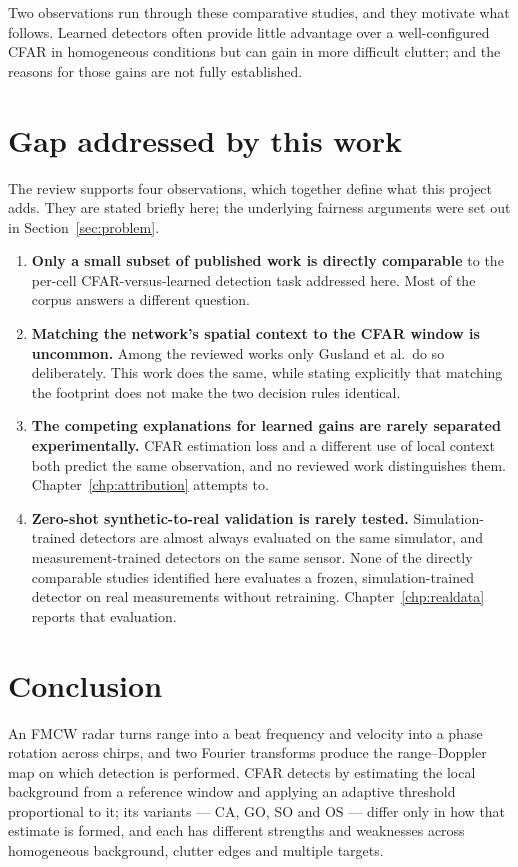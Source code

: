 Two observations run through these comparative studies, and they motivate what follows. Learned
detectors often provide little advantage over a well-configured CFAR in homogeneous conditions but
can gain in more difficult clutter; and the reasons for those gains are not fully established.

\section{Gap addressed by this work}

The review supports four observations, which together define what this project adds. They are
stated briefly here; the underlying fairness arguments were set out in
Section~\ref{sec:problem}.

\begin{enumerate}
\itemsep3pt
\item \textbf{Only a small subset of published work is directly comparable} to the per-cell
CFAR-versus-learned detection task addressed here. Most of the corpus answers a different question.
\item \textbf{Matching the network's spatial context to the CFAR window is uncommon.} Among the
reviewed works only Gusland et al.\ do so deliberately. This work does the same, while stating
explicitly that matching the footprint does not make the two decision rules identical.
\item \textbf{The competing explanations for learned gains are rarely separated experimentally.}
CFAR estimation loss and a different use of local context both predict the same observation, and no
reviewed work distinguishes them. Chapter~\ref{chp:attribution} attempts to.
\item \textbf{Zero-shot synthetic-to-real validation is rarely tested.} Simulation-trained
detectors are almost always evaluated on the same simulator, and measurement-trained detectors on
the same sensor. None of the directly comparable studies identified here evaluates a frozen,
simulation-trained detector on real measurements without retraining. Chapter~\ref{chp:realdata}
reports that evaluation.
\end{enumerate}

\section{Conclusion}

An FMCW radar turns range into a beat frequency and velocity into a phase rotation across chirps,
and two Fourier transforms produce the range--Doppler map on which detection is performed. CFAR
detects by estimating the local background from a reference window and applying an adaptive
threshold proportional to it; its variants --- CA, GO, SO and OS --- differ only in how that
estimate is formed, and each has different strengths and weaknesses across homogeneous background,
clutter edges and multiple targets.

